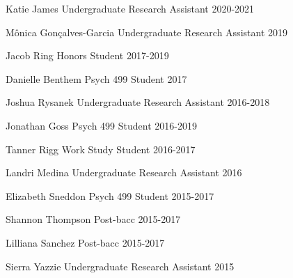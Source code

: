 \begin{cvhonors}
  \cvhonor
    {Katie James} %
    { Undergraduate Research Assistant} %
    {} %
    {2020-2021} %
    
  \cvhonor
    {M\^{o}nica Gon\c{c}alves-Garcia} %
    {Undergraduate Research Assistant} %
    {} %
    {2019} %

  \cvhonor
    {Jacob Ring} %
    {Honors Student} %
    {} %
    {2017-2019} %

  \cvhonor
    {Danielle Benthem} %
    {Psych 499 Student} %
    {} %
    {2017} %

  \cvhonor
    {Joshua Rysanek} %
    {Undergraduate Research Assistant} %
    {} %
    {2016-2018} %

  \cvhonor
    {Jonathan Goss} %
    {Psych 499 Student} %
    {} %
    {2016-2019} %
    
  \cvhonor
    {Tanner Rigg} %
    {Work Study Student} %
    {} %
    {2016-2017} %
    
  \cvhonor
    {Landri Medina} %
    {Undergraduate Research Assistant} %
    {} %
    {2016} %
    
  \cvhonor
    {Elizabeth Sneddon} %
    {Psych 499 Student} %
    {} %
    {2015-2017} %
    
  \cvhonor
    {Shannon Thompson} %
    {Post-bacc} %
    {} %
    {2015-2017} %
    
  \cvhonor
    {Lilliana Sanchez} %
    {Post-bacc} %
    {} %
    {2015-2017} %
    
  \cvhonor
    {Sierra Yazzie} %
    {Undergraduate Research Assistant} %
    {} %
    {2015} %
\end{cvhonors}